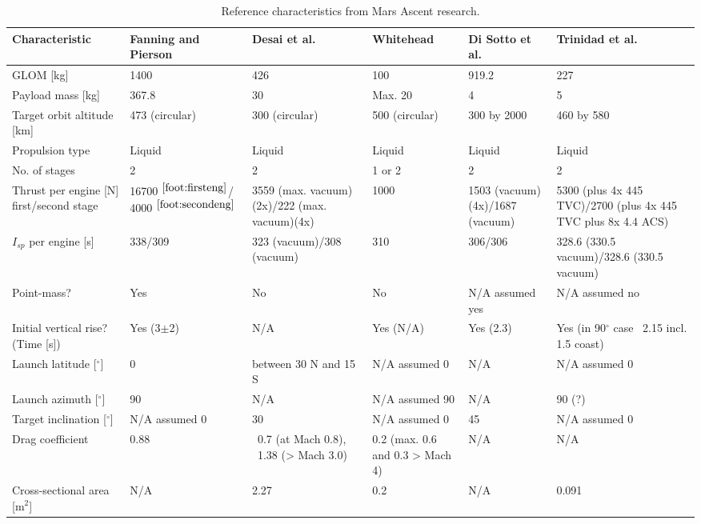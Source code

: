 \begin{longtable}{|p{3cm}|p{2cm}|p{2cm}|p{2cm}|p{2cm}|p{2cm}|}
\caption{Reference characteristics from Mars Ascent research.}
\label{tab:valid_char_mars_res}
\endfirsthead
\endhead
\hline 
\textbf{Characteristic} 	& \textbf{Fanning and Pierson \cite{fanning1996model}} & \textbf{Desai et al. \cite{desai1998}} & \textbf{Whitehead \cite{whitehead2004mars,whitehead2005}} & \textbf{Di Sotto et al. \cite{di2007system}} & \textbf{Trinidad et al. \cite{trinidad2012}} \\ \hline \hline
\ac{GLOM} [kg] & 1400 & 426 & 100 & 919.2& 227\\ \hline
Payload mass [kg] & 367.8 & 30 & Max. 20 & 4 & 5\\ \hline
Target orbit altitude [km] & 473 (circular)& 300 (circular) & 500 (circular) & 300 by 2000 & 460 by 580\\ \hline
Propulsion type & Liquid & Liquid & Liquid & Liquid & Liquid\\ \hline
No. of stages & 2 & 2 & 1 or 2 & 2 & 2\\ \hline
Thrust per engine [N] first/second stage & 16700 $^{\ref{foot:firsteng}}$/ 4000 $^{\ref{foot:secondeng}}$& 3559 (max. vacuum)(2x)/222 (max. vacuum)(4x) &1000 & 1503 (vacuum)(4x)/1687 (vacuum) & 5300 (plus 4x 445 \ac{TVC})/2700 (plus 4x 445 \ac{TVC} plus 8x 4.4 \ac{ACS})\\ \hline
$I_{sp}$ per engine [s] & 338/309 & 323 (vacuum)/308 (vacuum) &310 &306/306 & 328.6 (330.5 vacuum)/328.6 (330.5 vacuum)\\ \hline
Point-mass? & Yes & No & No & \ac{N/A} assumed yes &\ac{N/A} assumed no\\ \hline
Initial vertical rise? (Time [s])& Yes (3$\pm$2) & \ac{N/A} & Yes (\ac{N/A})& Yes (2.3)& Yes (in 90$^{\circ}$ case ~2.15 incl. 1.5 coast)\\ \hline
Launch latitude [$^{\circ}$] & 0 & between 30 N and 15 S & \ac{N/A} assumed 0 &\ac{N/A} &\ac{N/A} assumed 0\\ \hline
Launch azimuth [$^{\circ}$] & 90 & \ac{N/A} & \ac{N/A} assumed 90 & \ac{N/A}&90 (?)\\ \hline
Target inclination [$^{\circ}$] & \ac{N/A} assumed 0 & 30 & \ac{N/A} assumed 0& 45 & \ac{N/A} assumed 0\\ \hline
Drag coefficient & 0.88 & ~0.7 (at Mach 0.8), ~1.38 (> Mach 3.0) &0.2 (max. 0.6 and 0.3 > Mach 4) &\ac{N/A} &\ac{N/A}\\ \hline
Cross-sectional area [m$^{2}$] & \ac{N/A} & 2.27 & 0.2 & \ac{N/A} & 0.091 \\ \hline
\end{longtable}

